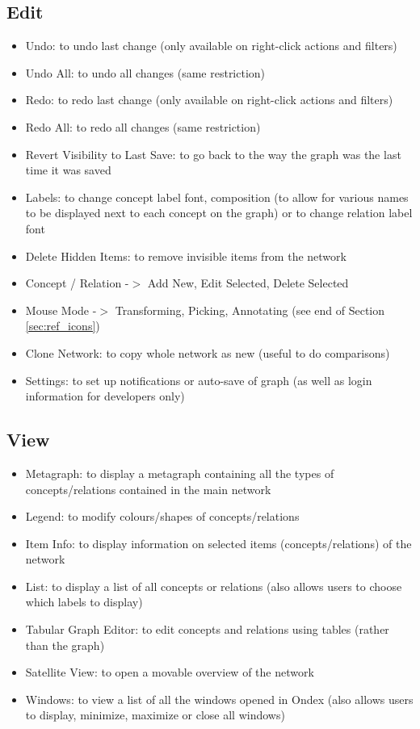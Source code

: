 \subsection{Edit}
\label{sec:menu_edit}
\begin{itemize}
\item Undo: to undo last change (only available on right-click actions and filters)
\item Undo All: to undo all changes (same restriction)
\item Redo: to redo last change (only available on right-click actions and filters)
\item Redo All: to redo all changes (same restriction)
\item Revert Visibility to Last Save: to go back to the way the graph was the last time it was saved
\item Labels: to change concept label font, composition (to allow for various names to be displayed next to each concept on the graph) or to change relation label font
\item Delete Hidden Items: to remove invisible items from the network
\item Concept / Relation -$>$ Add New, Edit Selected, Delete Selected
\item Mouse Mode -$>$ Transforming, Picking, Annotating (see end of Section \ref{sec:ref_icons})
\item Clone Network: to copy whole network as new (useful to do comparisons)
\item Settings: to set up notifications or auto-save of graph (as well as login information for developers only)
\end{itemize}

\subsection{View}
\label{sec:menu_view}
\begin{itemize}
\item Metagraph: to display a metagraph containing all the types of concepts/relations contained in the main network
\item Legend: to modify colours/shapes of concepts/relations
\item Item Info: to display information on selected items (concepts/relations) of the network
\item List: to display a list of all concepts or relations (also allows users to choose which labels to display)
\item Tabular Graph Editor: to edit concepts and relations using tables (rather than the graph)
\item Satellite View: to open a movable overview of the network
\item Windows: to view a list of all the windows opened in Ondex (also allows users to display, minimize, maximize or close all windows)
\end{itemize}


